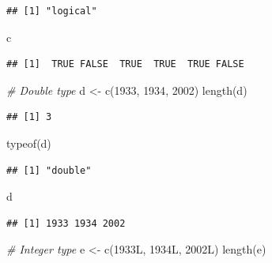 \documentclass[
]{book}
\newenvironment{Shaded}{\begin{snugshade}}{\end{snugshade}}
\newcommand{\CommentTok}[1]{\textcolor[rgb]{0.56,0.35,0.01}{\textit{#1}}}
\newcommand{\DecValTok}[1]{\textcolor[rgb]{0.00,0.00,0.81}{#1}}
\newcommand{\FunctionTok}[1]{\textcolor[rgb]{0.00,0.00,0.00}{#1}}
\newcommand{\NormalTok}[1]{#1}
\newcommand{\OtherTok}[1]{\textcolor[rgb]{0.56,0.35,0.01}{#1}}
\begin{document}
\begin{verbatim}
## [1] "logical"
\end{verbatim}

\begin{Shaded}
\begin{Highlighting}[]
\NormalTok{c}
\end{Highlighting}
\end{Shaded}

\begin{verbatim}
## [1]  TRUE FALSE  TRUE  TRUE  TRUE FALSE
\end{verbatim}

\begin{Shaded}
\begin{Highlighting}[]
\CommentTok{\# Double type }
\NormalTok{d }\OtherTok{\textless{}{-}} \FunctionTok{c}\NormalTok{(}\DecValTok{1933}\NormalTok{, }\DecValTok{1934}\NormalTok{, }\DecValTok{2002}\NormalTok{)}
\FunctionTok{length}\NormalTok{(d)}
\end{Highlighting}
\end{Shaded}

\begin{verbatim}
## [1] 3
\end{verbatim}

\begin{Shaded}
\begin{Highlighting}[]
\FunctionTok{typeof}\NormalTok{(d)}
\end{Highlighting}
\end{Shaded}

\begin{verbatim}
## [1] "double"
\end{verbatim}

\begin{Shaded}
\begin{Highlighting}[]
\NormalTok{d}
\end{Highlighting}
\end{Shaded}

\begin{verbatim}
## [1] 1933 1934 2002
\end{verbatim}

\begin{Shaded}
\begin{Highlighting}[]
\CommentTok{\# Integer type }
\NormalTok{e }\OtherTok{\textless{}{-}} \FunctionTok{c}\NormalTok{(1933L, 1934L, 2002L)}
\FunctionTok{length}\NormalTok{(e)}
\end{Highlighting}
\end{Shaded}
\end{document}
